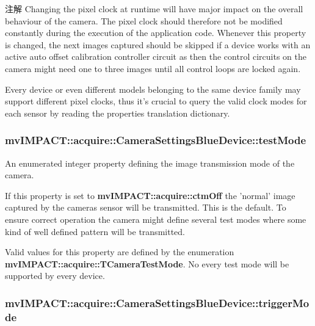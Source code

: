 \begin{DoxyNote}{注解}
Changing the pixel clock at runtime will have major impact on the overall behaviour of the camera. The pixel clock should therefore not be modified constantly during the execution of the application code. Whenever this property is changed, the next images captured should be skipped if a device works with an active auto offset calibration controller circuit as then the control circuits on the camera might need one to three images until all control loops are locked again.
\end{DoxyNote}
Every device or even different models belonging to the same device family may support different pixel clocks, thus it's crucial to query the valid clock modes for each sensor by reading the properties translation dictionary. \hypertarget{classmv_i_m_p_a_c_t_1_1acquire_1_1_camera_settings_blue_device_a986bc69aacf955629a6c3d0cf5971dc5}{
\subsubsection[{test\+Mode}]{ mv\+I\+M\+P\+A\+C\+T\+::acquire\+::\+Camera\+Settings\+Blue\+Device\+::test\+Mode}}\label{classmv_i_m_p_a_c_t_1_1acquire_1_1_camera_settings_blue_device_a986bc69aacf955629a6c3d0cf5971dc5}


An enumerated integer property defining the image transmission mode of the camera. 

If this property is set to {\bfseries mv\+I\+M\+P\+A\+C\+T\+::acquire\+::ctm\+Off} the 'normal' image captured by the cameras sensor will be transmitted. This is the default. To ensure correct operation the camera might define several test modes where some kind of well defined pattern will be transmitted.

Valid values for this property are defined by the enumeration {\bfseries mv\+I\+M\+P\+A\+C\+T\+::acquire\+::\+T\+Camera\+Test\+Mode}. No every test mode will be supported by every device. \hypertarget{classmv_i_m_p_a_c_t_1_1acquire_1_1_camera_settings_blue_device_a736a6e90f7bb19b4f10e7ff0110c657e}{
\subsubsection[{trigger\+Mode}]{ mv\+I\+M\+P\+A\+C\+T\+::acquire\+::\+Camera\+Settings\+Blue\+Device\+::trigger\+Mode}}\label{classmv_i_m_p_a_c_t_1_1acquire_1_1_camera_settings_blue_device_a736a6e90f7bb19b4f10e7ff0110c657e}


